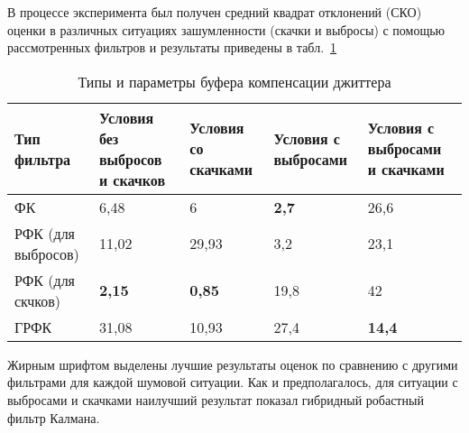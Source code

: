 В процессе эксперимента был получен средний квадрат отклонений (СКО) оценки в различных ситуациях зашумленности (скачки и выбросы) с помощью рассмотренных фильтров и результаты приведены в табл. \ref{fkDiffSit}



\begin{table} [htbp]
  \centering
  \parbox{15cm}{\caption{Типы и параметры буфера компенсации джиттера}\label{fkDiffSit}}
\begin{tabular}{|p{3cm}|p{3cm}|p{3cm}|p{3cm}|p{3cm}|}
    \hline
    Тип фильтра        & Условия без выбросов и скачков & Условия со скачками & Условия с выбросами & Условия с выбросами и скачками \\ \hline
    ФК                 & 6,48                           & 6                   & \textbf{2,7}                 & 26,6                           \\ \hline
    РФК (для выбросов) & 11,02                          & 29,93               & 3,2                 & 23,1                           \\ \hline
    РФК (для скчков)   & \textbf{2,15}                           & \textbf{0,85}                & 19,8                & 42                             \\ \hline
    ГРФК               & 31,08                          & 10,93               & 27,4                & \textbf{14,4}                           \\ \hline
    \end{tabular}
\end{table}








Жирным шрифтом выделены лучшие результаты оценок по сравнению с другими фильтрами для каждой шумовой ситуации. Как и предполагалось, для ситуации с выбросами и скачками наилучший результат показал гибридный робастный фильтр Калмана.









\clearpage

